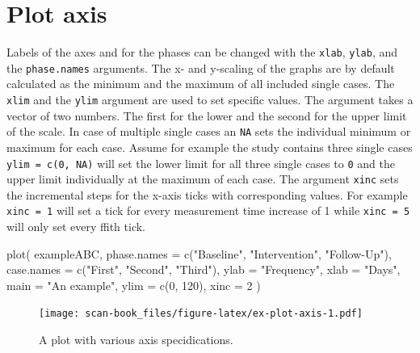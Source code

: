 \documentclass[
]{book}
\newenvironment{Shaded}{\begin{snugshade}}{\end{snugshade}}
\newcommand{\AttributeTok}[1]{\textcolor[rgb]{0.77,0.63,0.00}{#1}}
\newcommand{\DecValTok}[1]{\textcolor[rgb]{0.00,0.00,0.81}{#1}}
\newcommand{\FunctionTok}[1]{\textcolor[rgb]{0.00,0.00,0.00}{#1}}
\newcommand{\NormalTok}[1]{#1}
\newcommand{\StringTok}[1]{\textcolor[rgb]{0.31,0.60,0.02}{#1}}
\begin{document}
\hypertarget{plot-axis}{%
\section{Plot axis}\label{plot-axis}}

Labels of the axes and for the phases can be changed with the \texttt{xlab}, \texttt{ylab}, and the \texttt{phase.names} arguments. The x- and y-scaling of the graphs are by default calculated as the minimum and the maximum of all included single cases. The \texttt{xlim} and the \texttt{ylim} argument are used to set specific values. The argument takes a vector of two numbers. The first for the lower and the second for the upper limit of the scale. In case of multiple single cases an \texttt{NA} sets the individual minimum or maximum for each case. Assume for example the study contains three single cases \texttt{ylim\ =\ c(0,\ NA)} will set the lower limit for all three single cases to \texttt{0} and the upper limit individually at the maximum of each case. The argument \texttt{xinc} sets the incremental steps for the x-axis ticks with corresponding values. For example \texttt{xinc\ =\ 1} will set a tick for every measurement time increase of 1 while \texttt{xinc\ =\ 5} will only set every ffith tick.

\begin{Shaded}
\begin{Highlighting}[]
\FunctionTok{plot}\NormalTok{(}
\NormalTok{  exampleABC,}
  \AttributeTok{phase.names =} \FunctionTok{c}\NormalTok{(}\StringTok{"Baseline"}\NormalTok{, }\StringTok{"Intervention"}\NormalTok{, }\StringTok{"Follow{-}Up"}\NormalTok{),}
  \AttributeTok{case.names =} \FunctionTok{c}\NormalTok{(}\StringTok{"First"}\NormalTok{, }\StringTok{"Second"}\NormalTok{, }\StringTok{"Third"}\NormalTok{),}
  \AttributeTok{ylab =} \StringTok{"Frequency"}\NormalTok{,}
  \AttributeTok{xlab =} \StringTok{"Days"}\NormalTok{,}
  \AttributeTok{main =} \StringTok{"An example"}\NormalTok{,}
  \AttributeTok{ylim =} \FunctionTok{c}\NormalTok{(}\DecValTok{0}\NormalTok{, }\DecValTok{120}\NormalTok{),}
  \AttributeTok{xinc =} \DecValTok{2}
\NormalTok{)}
\end{Highlighting}
\end{Shaded}

\begin{figure}
\centering
\texttt{[image: scan-book\_files/figure-latex/ex-plot-axis-1.pdf]}
\caption{\label{fig:ex-plot-axis}A plot with various axis specidications.}
\end{figure}
\end{document}
